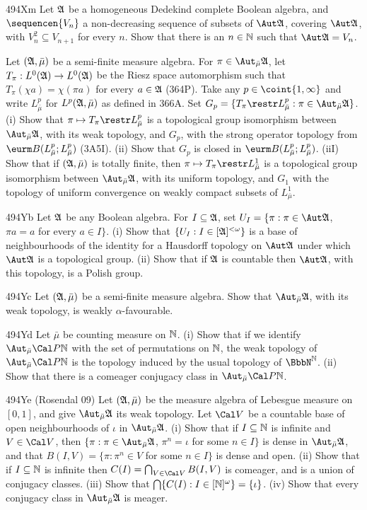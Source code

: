 {\spheader 494Xm Let $\frak A$ be a homogeneous Dedekind
complete Boolean algebra,
and $\sequencen{V_n}$ a non-decreasing sequence of subsets of
$\Aut\frak A$, covering $\Aut\frak A$, with $V_n^2\subseteq V_{n+1}$ for
every $n$.   Show that there is an $n\in\Bbb N$ such that
$\Aut\frak A=V_n$.

Let $(\frak A,\bar\mu)$ be a semi-finite measure algebra.
For $\pi\in\AmuA$, let
$T_{\pi}:L^0(\frak A)\to L^0(\frak A)$ be the Riesz space automorphism
such that $T_{\pi}(\chi a)=\chi(\pi a)$ for every $a\in\frak A$
(364P).   Take any $p\in\coint{1,\infty}$ and write $L^p_{\bar\mu}$ for
$L^p(\frak A,\bar\mu)$ as defined in 366A.   Set
$G_p=\{T_{\pi}\restr L^p_{\bar\mu}:\pi\in\AmuA\}$.
(i) Show that
$\pi\mapsto T_{\pi}\restr L^p_{\bar\mu}$ is a topological group isomorphism
between $\AmuA$, with its weak topology, and $G_p$, with the strong
operator topology from
$\eurm B(L^p_{\bar\mu};L^p_{\bar\mu})$ (3A5I).
(ii) Show that $G_p$ is closed in $\eurm B(L^p_{\bar\mu};L^p_{\bar\mu})$.
(iiI) Show that if $(\frak A,\bar\mu)$ is totally finite, then
$\pi\mapsto T_{\pi}\restr L^1_{\bar\mu}$ is a topological group isomorphism
between $\AmuA$, with its uniform topology, and $G_1$ with
the topology of uniform convergence on weakly compact subsets of
$L^1_{\bar\mu}$.

\spheader 494Yb Let $\frak A$ be any Boolean algebra.   For
$I\subseteq\frak A$, set
$U_I=\{\pi:\pi\in\Aut\frak A$, $\pi a=a$ for every $a\in I\}$.
(i) Show that
$\{U_I:I\in[\frak A]^{<\omega}\}$ is a base of neighbourhoods of the
identity for a Hausdorff topology on $\Aut\frak A$ under which
$\Aut\frak A$ is a topological group.   (ii) Show that if $\frak A$ is
countable then $\Aut\frak A$, with this topology, is a Polish group.

\spheader 494Yc Let $(\frak A,\bar\mu)$ be a
semi-finite measure algebra.   Show
that $\AmuA$, with its weak topology, is weakly $\alpha$-favourable.

\spheader 494Yd Let $\bar\mu$ be counting measure on $\Bbb N$.   (i) Show
that if we identify $\Aut_{\bar\mu}\Cal P\Bbb N$ with the set of
permutations on $\Bbb N$, the weak topology of $\Aut_{\bar\mu}\Cal P\Bbb N$
is the
topology induced by the usual topology of $\NN$.   (ii) Show that there is
a comeager conjugacy class in $\Aut_{\bar\mu}\Cal P\Bbb N$.

\spheader 494Ye ({\smc Rosendal 09})
Let $(\frak A,\bar\mu)$ be the measure algebra of Lebesgue
measure on $[0,1]$, and give $\AmuA$ its weak topology.
Let $\Cal V$ be a countable base of
open neighbourhoods of $\iota$ in $\AmuA$.
(i) Show that if $I\subseteq\Bbb N$ is infinite and $V\in\Cal V$, then
$\{\pi:\pi\in\AmuA$, $\pi^n=\iota$ for some $n\in I\}$ is dense in $\AmuA$,
and that $B(I,V)=\{\pi:\pi^n\in V$ for some $n\in I\}$ is dense and open.
(ii) Show that if $I\subseteq\Bbb N$ is infinite then
$C(I)=\bigcap_{V\in\Cal V}B(I,V)$ is comeager, and is a union of
conjugacy classes.   (iii) Show that
$\bigcap\{C(I):I\in[\Bbb N]^{\omega}\}=\{\iota\}$.   (iv) Show that every
conjugacy class in $\AmuA$ is meager.

}
